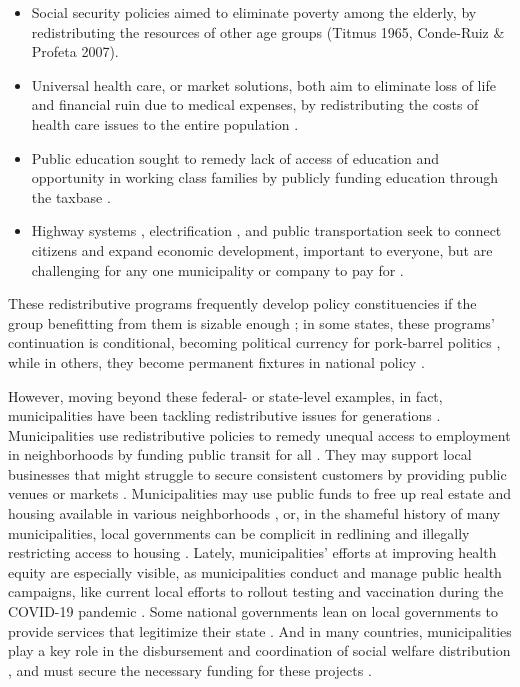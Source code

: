 \documentclass[preprint, 3p,
authoryear]{elsarticle} %
\begin{document}
\begin{itemize}
\item
  Social security policies aimed to eliminate poverty among the elderly,
  by redistributing the resources of other age groups (Titmus 1965,
  Conde-Ruiz \& Profeta 2007).
\item
  Universal health care, or market solutions, both aim to eliminate loss
  of life and financial ruin due to medical expenses, by redistributing
  the costs of health care issues to the entire population
  \citep{mettler_2011}.
\item
  Public education sought to remedy lack of access of education and
  opportunity in working class families by publicly funding education
  through the taxbase \citep{mettler_2005}.
\item
  Highway systems
  \citep{congleton_and_bennett_1995, zhu_and_brown_2013},
  electrification \citep{baker_and_phillips_2019, breetz_et_al_2018},
  and public transportation \citep{hood_2006} seek to connect citizens
  and expand economic development, important to everyone, but are
  challenging for any one municipality or company to pay for
  \citep{boarnet_and_haughwout_2000}.
\end{itemize}

These redistributive programs frequently develop policy constituencies
if the group benefitting from them is sizable enough
\citep{meltzer_and_richard_1981, campbell_2012}; in some states, these
programs' continuation is conditional, becoming political currency for
pork-barrel politics \citep{fukui_and_fukai_1996, catalinac_et_al_2020},
while in others, they become permanent fixtures in national policy
\citep{pierson_1994}.

However, moving beyond these federal- or state-level examples, in fact,
municipalities have been tackling redistributive issues for generations
\citep{peterson_1981, saiz_1999, tonkiss_2020}. Municipalities use
redistributive policies to remedy unequal access to employment in
neighborhoods by funding public transit for all
\citep{frankena_1973, asensio_et_al_2003, glaeser_et_al_2009, fearnley_and_aarhaug_2019, wiesel_and_liu_2021}.
They may support local businesses that might struggle to secure
consistent customers by providing public venues or markets
\citep{tangires_1997}. Municipalities may use public funds to free up
real estate and housing available in various neighborhoods
\citep{detter_and_folster_2017}, or, in the shameful history of many
municipalities, local governments can be complicit in redlining and
illegally restricting access to housing \citep{rothstein_2017}. Lately,
municipalities' efforts at improving health equity are especially
visible, as municipalities conduct and manage public health campaigns,
like current local efforts to rollout testing and vaccination during the
COVID-19 pandemic \citep{berkowitz_and_basu_2021}. Some national
governments lean on local governments to provide services that
legitimize their state \citep{wallace_2013}. And in many countries,
municipalities play a key role in the disbursement and coordination of
social welfare distribution
\citep{katz_and_allen_2001, weir_and_kind_2021}, and must secure the
necessary funding for these projects \citep{payson_2022}.
\end{document}
